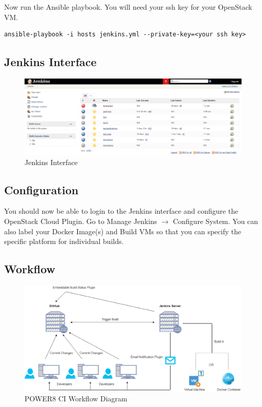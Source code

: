 \documentclass[10pt,letterpaper,onecolumn,draftclsnofoot]{IEEEtran}
\begin{document}
Now run the Ansible playbook. You will need your ssh key for your OpenStack VM.

\begin{verbatim}
ansible-playbook -i hosts jenkins.yml --private-key=<your ssh key>
\end{verbatim}
\subsection{Jenkins Interface}
\begin{figure}[H]
  \includegraphics[width=\textwidth]{images/jenkins.eps}
  \caption{Jenkins Interface}
\end{figure}
\subsection{Configuration}

You should now be able to login to the Jenkins interface and configure the OpenStack Cloud Plugin.
Go to Manage Jenkins $\rightarrow$ Configure System. You can also label your Docker Image(s) and Build VMs so that you can specify the specific platform for individual builds.
\subsection{Workflow}
\begin{figure}[H]
  \includegraphics[width=\textwidth]{images/workflow.eps}
  \caption{POWER8 CI Workflow Diagram}
\end{figure}
\clearpage
\end{document}
